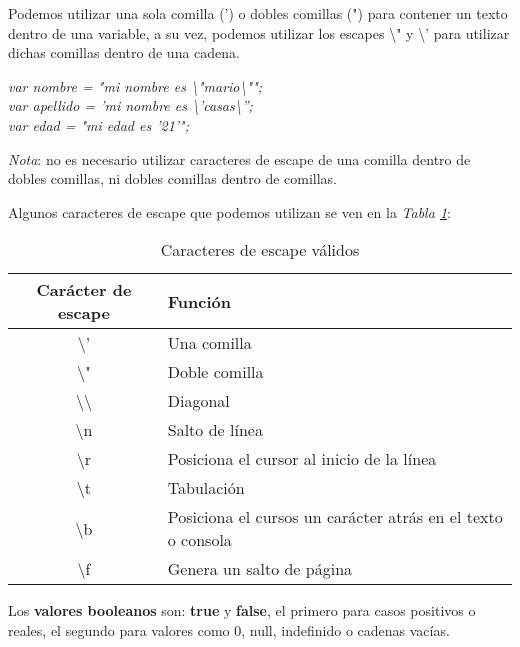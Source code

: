 Podemos utilizar una sola comilla (') o dobles comillas (") para contener un texto dentro de una variable, a su vez, podemos utilizar los escapes \textbackslash " y \textbackslash ' para utilizar dichas comillas dentro de una cadena.
\begin{center}
    \textit{
            var nombre = "mi nombre es \textbackslash"mario\textbackslash""; \\
            var apellido = 'mi nombre es \textbackslash'casas\textbackslash''; \\
            var edad = "mi edad es '21'";
            }
\end{center}

\textit{Nota}: no es necesario utilizar caracteres de escape de una comilla dentro de dobles comillas, ni dobles comillas dentro de comillas.

Algunos caracteres de escape que podemos utilizan se ven en la \textit{Tabla \ref{tab: 1}}:
\begin{table}[H]
    \begin{center}
        \caption{Caracteres de escape válidos}
        \label{tab: 1}
        \begin{tabular}{c l}
            \hline
            \textbf{Carácter de escape}&\textbf{Función} \\
            \hline
            \textbackslash ' & Una comilla \\
            \textbackslash " & Doble comilla \\
            \textbackslash \textbackslash & Diagonal \\
            \textbackslash n & Salto de línea \\
            \textbackslash r & Posiciona el cursor al inicio de la línea \\
            \textbackslash t & Tabulación \\
            \textbackslash b & Posiciona el cursos un carácter atrás en el texto o consola \\
            \textbackslash f & Genera un salto de página \\
            \hline
        \end{tabular}
    \end{center}
\end{table}

Los \textbf{valores booleanos} son: \textbf{true} y \textbf{false}, el primero para casos positivos o reales, el segundo para valores como 0, null, indefinido o cadenas vacías.


